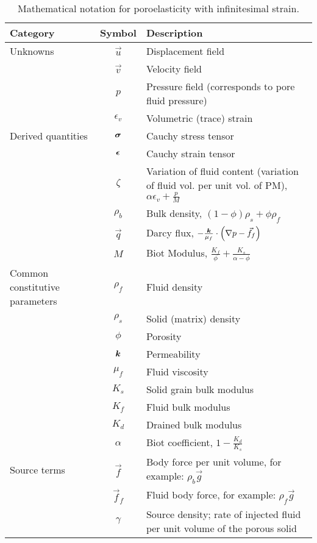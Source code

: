 \begin{table}[htbp]
  \caption{Mathematical notation for poroelasticity with
    infinitesimal strain.}
  \label{tab:notation:poroelasticity}
  \begin{tabular}{lcp{3.5in}}
    \toprule
    {\bf Category} & {\bf Symbol} & {\bf Description} \\
    \midrule
    Unknowns           & $\vec{u}$ & Displacement field \\
                       & $\vec{v}$ & Velocity field \\
                       & $p$       & Pressure field (corresponds to pore fluid pressure) \\
                       & $\epsilon_{v}$ & Volumetric (trace) strain \\
    \hline
    Derived quantities & $\bm{\sigma}$ & Cauchy stress tensor \\
                       & $\bm{\epsilon}$ & Cauchy strain tensor \\
                       & $\zeta$ & Variation of fluid content (variation of fluid vol. per unit vol. of PM), $\alpha \epsilon_{v} + \frac{p}{M}$ \\
                       & $\rho_{b}$ & Bulk density, $\left(1 - \phi\right) \rho_{s} + \phi \rho_{f}$ \\
                       & $\vec{q}$ & Darcy flux, $-\frac{\bm{k}}{\mu_{f}} \cdot \left(\nabla p - \vec{f}_{f}\right)$ \\
                       & $M$ & Biot Modulus, $\frac{K_{f}}{\phi} + \frac{K_{s}}{\alpha - \phi}$ \\
    \hline
    Common constitutive parameters & $\rho_{f}$ & Fluid density \\
                       & $\rho_{s}$ & Solid (matrix) density \\
                       & $\phi$ & Porosity \\
                       & $\bm{k}$ & Permeability \\
                       & $\mu_{f}$ & Fluid viscosity \\
                       & $K_{s}$ & Solid grain bulk modulus \\
                       & $K_{f}$ & Fluid bulk modulus \\
                       & $K_{d}$ & Drained bulk modulus \\
                       & $\alpha$ & Biot coefficient, $1 - \frac{K_{d}}{K_{s}}$ \\
    \hline
    Source terms       & $\vec{f}$ & Body force per unit volume, for example: $\rho_{b} \vec{g}$ \\
                       & $\vec{f}_{f}$ & Fluid body force, for example: $\rho_{f} \vec{g}$ \\
                       & $\gamma$ & Source density; rate of injected fluid per unit volume of the porous solid \\
    \bottomrule
  \end{tabular}
\end{table}



